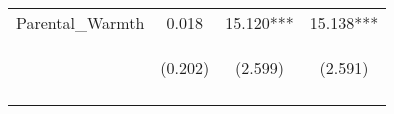 \begin{tabular}{lccc}
\noalign{\smallskip}Parental_Warmth & 0.018 & 15.120*** & 15.138***\\
 & \begin{footnotesize}(0.202)\end{footnotesize} & \begin{footnotesize}(2.599)\end{footnotesize} & \begin{footnotesize}(2.591)\end{footnotesize}\\
\noalign{\smallskip}\hline\end{tabular}\\
